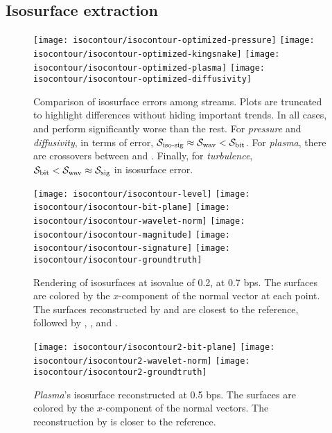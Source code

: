 \subsection{Isosurface extraction}\label{sec:isocontour}

\begin{figure*}[h]
\centering
{}
{\texttt{[image: isocontour/isocontour-optimized-pressure]}}
{\texttt{[image: isocontour/isocontour-optimized-kingsnake]}}
{\texttt{[image: isocontour/isocontour-optimized-plasma]}}
{\texttt{[image: isocontour/isocontour-optimized-diffusivity]}}
\caption{Comparison of isosurface errors among streams. Plots are truncated to highlight differences
without hiding important trends. In all cases, \slvl and \smag perform significantly worse than the
rest. For \emph{pressure} and \emph{diffusivity}, in terms of error, $\sisg \approx \swav < \sbit$.
For \emph{plasma}, there are crossovers between \sbit and \swav. Finally, for \emph{turbulence},
$\sbit < \swav \approx \ssig$ in isosurface error.} \label{fig:isocontour-plots}
\vspace{1em}

\centering
{}
{\texttt{[image: isocontour/isocontour-level]}}
{\texttt{[image: isocontour/isocontour-bit-plane]}}
{\texttt{[image: isocontour/isocontour-wavelet-norm]}}
{\texttt{[image: isocontour/isocontour-magnitude]}}
{\texttt{[image: isocontour/isocontour-signature]}}
{\texttt{[image: isocontour/isocontour-groundtruth]}} 
\caption{Rendering of isosurfaces at isovalue of 0.2, at 0.7 bps. The surfaces are colored by the
$x$-component of the normal vector at each point. The surfaces reconstructed by \swav and \sisg are
closest to the reference, followed by \sbit, \smag, and \slvl.}
\label{fig:isocontour-surfaces-pressure}
\end{figure*}

\begin{figure}[h]
\centering
{}
{\texttt{[image: isocontour/isocontour2-bit-plane]}}
{\texttt{[image: isocontour/isocontour2-wavelet-norm]}}
{\texttt{[image: isocontour/isocontour2-groundtruth]}}
\caption{\emph{Plasma}'s isosurface reconstructed at 0.5 bps. The surfaces are colored by the
$x$-component of the normal vectors. The reconstruction by \sbit is closer to the reference.}
\label{fig:isocontour-surfaces-plasma}
\end{figure}

